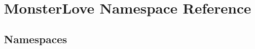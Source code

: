 \hypertarget{namespace_monster_love}{}\section{Monster\+Love Namespace Reference}
\label{namespace_monster_love}
\subsection*{Namespaces}
\begin{DoxyCompactItemize}
\end{DoxyCompactItemize}
